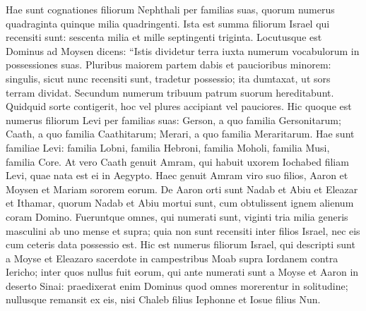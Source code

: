 \begin{biblechapter}
\verse Hae sunt cognationes filiorum Nephthali per familias suas, quorum numerus quadraginta quinque milia quadringenti. 
\verse Ista est summa filiorum Israel qui recensiti sunt: sescenta milia et mille septingenti triginta. 
\verse Locutusque est Dominus ad Moysen dicens: 
\verse “Istis dividetur terra iuxta numerum vocabulorum in possessiones suas. 
\verse Pluribus maiorem partem dabis et paucioribus minorem: singulis, sicut nunc recensiti sunt, tradetur possessio;  
\verse ita dumtaxat, ut sors terram dividat. Secundum numerum tribuum patrum suorum hereditabunt. 
\verse Quidquid sorte contigerit, hoc vel plures accipiant vel pauciores. 
\verse Hic quoque est numerus filiorum Levi per familias suas: Gerson, a quo familia Gersonitarum; Caath, a quo familia Caathitarum; Merari, a quo familia Meraritarum. 
\verse Hae sunt familiae Levi: familia Lobni, familia Hebroni, familia Moholi, familia Musi, familia Core. At vero Caath genuit Amram, 
\verse qui habuit uxorem Iochabed filiam Levi, quae nata est ei in Aegypto. Haec genuit Amram viro suo filios, Aaron et Moysen et Mariam sororem eorum. 
\verse De Aaron orti sunt Nadab et Abiu et Eleazar et Ithamar, 
\verse quorum Nadab et Abiu mortui sunt, cum obtulissent ignem alienum coram Domino. 
\verse Fueruntque omnes, qui numerati sunt, viginti tria milia generis masculini ab uno mense et supra; quia non sunt recensiti inter filios Israel, nec eis cum ceteris data possessio est. 
\verse Hic est numerus filiorum Israel, qui descripti sunt a Moyse et Eleazaro sacerdote in campestribus Moab supra Iordanem contra Iericho; 
\verse inter quos nullus fuit eorum, qui ante numerati sunt a Moyse et Aaron in deserto Sinai:  
\verse praedixerat enim Dominus quod omnes morerentur in solitudine; nullusque remansit ex eis, nisi Chaleb filius Iephonne et Iosue filius Nun. 
\end{biblechapter}

